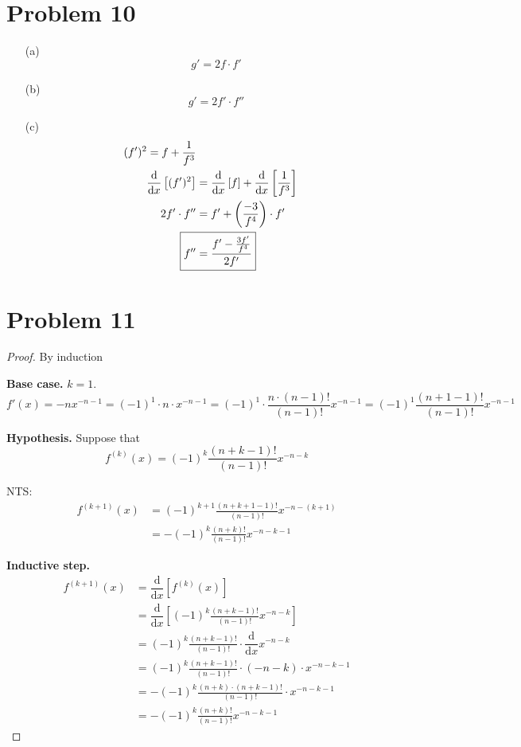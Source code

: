 \documentclass{article}
\newcommand*{\paren}[1]{\ensuremath\left(#1\right)}
\newcommand*{\problem}[1]{\section*{Problem #1}}
\newcommand*{\deriv}[1][x]{\ensuremath{\dfrac{\mathrm{d}}{\mathrm{d}#1}}}
\newcommand*{\Deriv}[2][x]{\ensuremath{\dfrac{\mathrm{d}}{\mathrm{d}#1}\left[#2\right]}}
\begin{document}
\problem{10}
\begin{itemize}
	\item[(a)]
	\begin{equation*}
		g'=2f\cdot f'
	\end{equation*}

	\item[(b)]
	\begin{equation*}
		g'=2f'\cdot f''
	\end{equation*}

	\item[(c)]
	\begin{align*}
		(f')^2=f+\frac{1}{f^3} \\
		\Deriv{(f')^2}&=\Deriv{f}+\Deriv{\frac{1}{f^3}} \\
		2f'\cdot f''&=f'+\paren{\frac{-3}{f^4}}\cdot f' \\
		\Aboxed{f''&=\frac{f'-\frac{3f'}{f^4}}{2f'}}
	\end{align*}
\end{itemize}

\problem{11}
\begin{proof}
	By induction

	\textbf{Base case.} $k=1$.
	\begin{equation*}
		f'(x)=-nx^{-n-1}=(-1)^1\cdot n\cdot x^{-n-1}=(-1)^1\cdot\frac{n\cdot(n-1)!}{(n-1)!}x^{-n-1}=(-1)^1\frac{(n+1-1)!}{(n-1)!}x^{-n-1}
	\end{equation*}

	\textbf{Hypothesis.} Suppose that
	\begin{equation*}
		f^{(k)}(x)=(-1)^k\frac{(n+k-1)!}{(n-1)!}x^{-n-k}
	\end{equation*}

	NTS:
	\begin{align*}
		f^{(k+1)}(x)&=(-1)^{k+1}\frac{(n+k+1-1)!}{(n-1)!}x^{-n-(k+1)} \\
		&=-(-1)^k\frac{(n+k)!}{(n-1)!}x^{-n-k-1}
	\end{align*}

	\textbf{Inductive step.}
	\begin{align*}
		f^{(k+1)}(x)&=\Deriv{f^{(k)}(x)} \\
		&=\Deriv{(-1)^k\frac{(n+k-1)!}{(n-1)!}x^{-n-k}} \\
		&=(-1)^k\frac{(n+k-1)!}{(n-1)!}\cdot\deriv x^{-n-k} \\
		&=(-1)^k\frac{(n+k-1)!}{(n-1)!}\cdot(-n-k)\cdot x^{-n-k-1} \\
		&=-(-1)^k\frac{(n+k)\cdot(n+k-1)!}{(n-1)!}\cdot x^{-n-k-1} \\
		&=-(-1)^k\frac{(n+k)!}{(n-1)!}x^{-n-k-1}
	\end{align*}
\end{proof}
\end{document}
